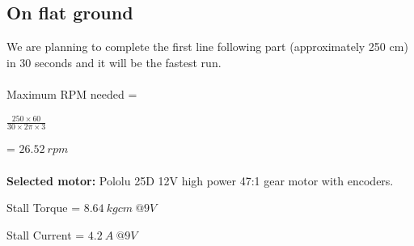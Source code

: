 \documentclass[a4paper, 12pt]{article}
\begin{document}
\subsection*{On flat ground}
We are planning to complete the first line following part (approximately 250 cm) in 30 seconds and it will be the fastest run.\\
\\
Maximum RPM needed = \begin{Large}$\frac{250 \times 60}{30 \times 2\pi \times 3}$\end{Large} = $26.52\ rpm$\\
\\	
\textbf{Selected motor:} Pololu 25D 12V high power 47:1 gear motor with encoders.

Stall Torque = $8.64\ kgcm\ @9V$

Stall Current = $4.2\ A\ @9V$
\end{document}
